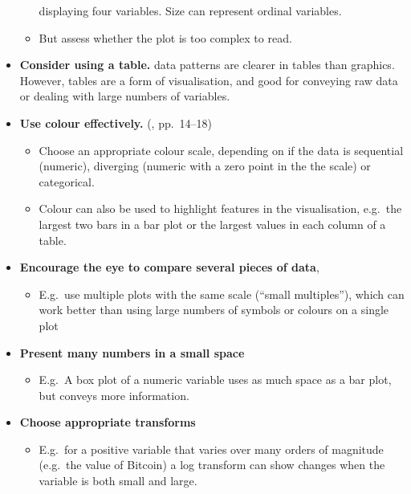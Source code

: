 \documentclass[10pt]{article}
\begin{document}
\begin{multicols}{3}
\begin{itemize}
\begin{itemize}
    displaying four variables. Size can represent ordinal variables.
  \item But assess whether the plot is too complex to read.
  \end{itemize}
\item \textbf{Consider using a table.} data patterns are clearer in
  tables than graphics. However, tables are a form of visualisation,
  and good for conveying raw data or dealing with large numbers of
  variables.
\item \textbf{Use colour effectively.} (\citealp{WexlEtal17big}, pp.~14--18)
  \begin{itemize}
  \item Choose an appropriate colour scale, depending on if the data
    is sequential (numeric), diverging (numeric with a zero point in
    the the scale) or categorical.
  \item Colour can also be used to highlight features in the visualisation,
    e.g.~the largest two bars in a bar plot or the largest values in
    each column of a table.
  \end{itemize}
\item \textbf{Encourage the eye to compare several pieces of data}, 
  \begin{itemize}
  \item E.g.~use multiple plots with the same scale (``small
    multiples''), which can work better than using large numbers of
    symbols or colours on a single plot
  \end{itemize}

\item \textbf{Present many numbers in a small space}
  \begin{itemize}
  \item E.g.~A box plot of a numeric variable uses as much space as a
    bar plot, but conveys more information.
  \end{itemize}
\item \textbf{Choose appropriate transforms}
  \begin{itemize}
  \item E.g.~for a positive variable that varies over many orders of
    magnitude (e.g.~the value of Bitcoin) a log transform can show
    changes when the variable is both small and large.
  \end{itemize}
\end{itemize}



\end{multicols}
\end{document}
